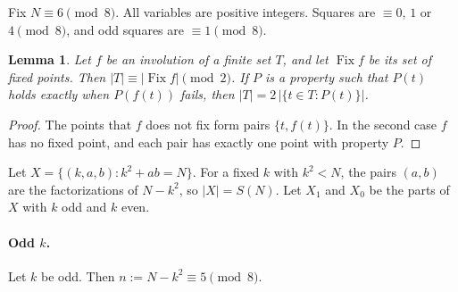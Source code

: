 \documentclass[11pt]{article}
\newtheorem{lemma}[theorem]{Lemma}
\theoremstyle{remark}
\newcommand{\Fix}{\operatorname{Fix}}
\begin{document}
Fix $N\equiv 6\pmod 8$. All variables are positive integers. Squares are $\equiv 0$, $1$ or $4\pmod 8$, and odd squares are $\equiv 1\pmod 8$.

\begin{lemma}\label{lem:inv}
Let $f$ be an involution of a finite set $T$, and let $\Fix f$ be its set of fixed points. Then $|T|\equiv|\Fix f|\pmod 2$. If $P$ is a property such that $P(t)$ holds exactly when $P(f(t))$ fails, then $|T|=2\,|\{t\in T: P(t)\}|$.
\end{lemma}

\begin{proof}
The points that $f$ does not fix form pairs $\{t,f(t)\}$. In the second case $f$ has no fixed point, and each pair has exactly one point with property $P$.
\end{proof}

Let $X=\{(k,a,b): k^2+ab=N\}$. For a fixed $k$ with $k^2<N$, the pairs $(a,b)$ are the factorizations of $N-k^2$, so $|X|=S(N)$. Let $X_1$ and $X_0$ be the parts of $X$ with $k$ odd and $k$ even.

\paragraph{Odd $k$.} Let $k$ be odd. Then $n:=N-k^2\equiv 5\pmod 8$.
\end{document}
